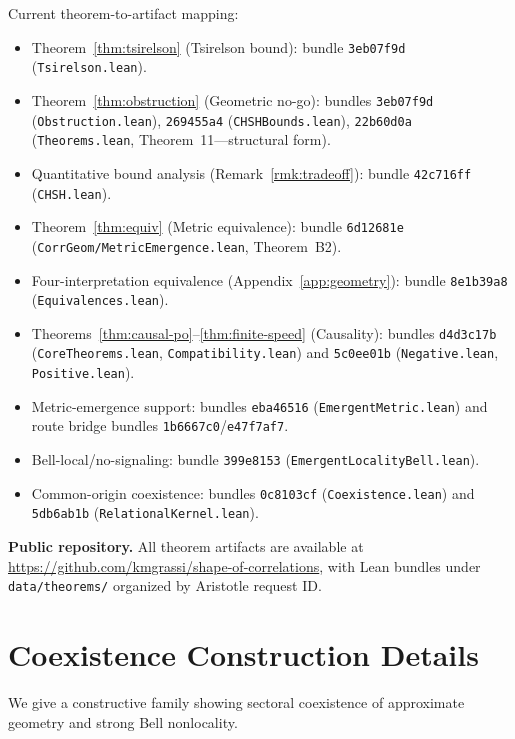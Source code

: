 \documentclass[11pt,a4paper]{article}
\theoremstyle{definition}
\theoremstyle{remark}
\begin{document}
Current theorem-to-artifact mapping:
\begin{itemize}[nosep]
  \item Theorem~\ref{thm:tsirelson} (Tsirelson bound): bundle \texttt{3eb07f9d} (\texttt{Tsirelson.lean}).
  \item Theorem~\ref{thm:obstruction} (Geometric no-go): bundles \texttt{3eb07f9d} (\texttt{Obstruction.lean}), \texttt{269455a4} (\texttt{CHSHBounds.lean}), \texttt{22b60d0a} (\texttt{Theorems.lean}, Theorem~11---structural form).
  \item Quantitative bound analysis (Remark~\ref{rmk:tradeoff}): bundle \texttt{42c716ff} (\texttt{CHSH.lean}).
  \item Theorem~\ref{thm:equiv} (Metric equivalence): bundle \texttt{6d12681e} (\texttt{CorrGeom/MetricEmergence.lean}, Theorem~B2).
  \item Four-interpretation equivalence (Appendix~\ref{app:geometry}): bundle \texttt{8e1b39a8} (\texttt{Equivalences.lean}).
  \item Theorems~\ref{thm:causal-po}--\ref{thm:finite-speed} (Causality): bundles \texttt{d4d3c17b} (\texttt{CoreTheorems.lean}, \texttt{Compatibility.lean}) and \texttt{5c0ee01b} (\texttt{Negative.lean}, \texttt{Positive.lean}).
  \item Metric-emergence support: bundles \texttt{eba46516} (\texttt{EmergentMetric.lean}) and route bridge bundles \texttt{1b6667c0}/\texttt{e47f7af7}.
  \item Bell-local/no-signaling: bundle \texttt{399e8153} (\texttt{EmergentLocalityBell.lean}).
  \item Common-origin coexistence: bundles \texttt{0c8103cf} (\texttt{Coexistence.lean}) and \texttt{5db6ab1b} (\texttt{RelationalKernel.lean}).
\end{itemize}

\noindent\textbf{Public repository.} All theorem artifacts are available at \url{https://github.com/kmgrassi/shape-of-correlations}, with Lean bundles under \texttt{data/theorems/} organized by Aristotle request ID.


\section{Coexistence Construction Details}\label{app:coexistence}

We give a constructive family showing sectoral coexistence of approximate geometry and strong Bell nonlocality.
\end{document}
